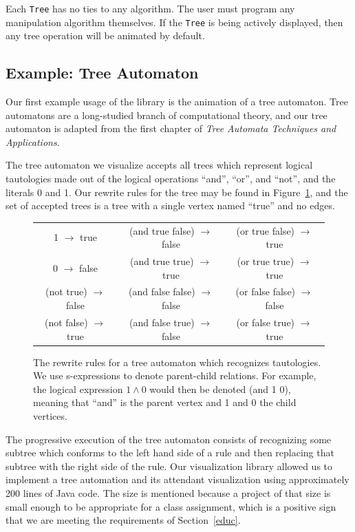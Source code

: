 \documentclass{article}
\newcommand{\java}[1]{\texttt{#1}\index{#1}}
\begin{document}
Each \java{Tree} has no ties to any algorithm.  The user must program any manipulation algorithm themselves.  If the \java{Tree} is being actively displayed, then any tree operation will be animated by default.

\subsection{Example: Tree Automaton}

Our first example usage of the library is the animation of a tree automaton.  Tree automatons are a long-studied branch of computational theory, and our tree automaton is adapted from the first chapter of {\it Tree Automata Techniques and Applications}\cite{tata2007}.

The tree automaton we visualize accepts all trees which represent logical tautologies made out of the logical operations ``and'', ``or'', and ``not'', and the literals 0 and 1.  Our rewrite rules for the tree may be found in Figure~\ref{fig:rules}, and the set of accepted trees is a tree with a single vertex named ``true'' and no edges.

\begin{figure}
  \begin{tabular}{c c c}
     1 $\to$ true            & (and true false) $\to$ false & (or true false) $\to$ true \\
     0 $\to$ false           & (and true true) $\to$ true & (or true true) $\to$ true \\
     (not true) $\to$ false & (and false false) $\to$ false & (or false false) $\to$ false \\
     (not false) $\to$ true & (and false true) $\to$ false & (or false true) $\to$ true 
    \end{tabular}
\caption{The rewrite rules for a tree automaton which recognizes tautologies. We use s-expressions to denote parent-child relations.  For example, the logical expression $1 \land 0$ would then be denoted (and 1 0), meaning that ``and'' is the parent vertex and 1 and 0 the child vertices.}
\label{fig:rules}
\end{figure}

The progressive execution of the tree automaton consists of recognizing some
subtree which conforms to the left hand side of a rule and then replacing that
subtree with the right side of the rule.  Our visualization library allowed us
to implement a tree automation and its attendant visualization using
approximately 200 lines of Java code.  The size is mentioned because a project of that size is small enough to be appropriate for a class assignment, which is a positive sign that we are meeting the requirements of Section~\ref{educ}.
\end{document}
